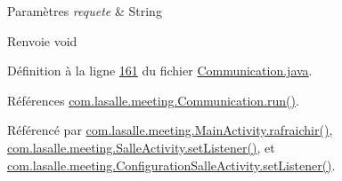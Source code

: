 \begin{DoxyParams}{Paramètres}
{\em requete} & String \\
\hline
\end{DoxyParams}
\begin{DoxyReturn}{Renvoie}
void 
\end{DoxyReturn}


Définition à la ligne \hyperlink{_communication_8java_source_l00161}{161} du fichier \hyperlink{_communication_8java_source}{Communication.\+java}.



Références \hyperlink{_communication_8java_source_l00247}{com.\+lasalle.\+meeting.\+Communication.\+run()}.



Référencé par \hyperlink{_main_activity_8java_source_l00330}{com.\+lasalle.\+meeting.\+Main\+Activity.\+rafraichir()}, \hyperlink{_salle_activity_8java_source_l00132}{com.\+lasalle.\+meeting.\+Salle\+Activity.\+set\+Listener()}, et \hyperlink{_configuration_salle_activity_8java_source_l00138}{com.\+lasalle.\+meeting.\+Configuration\+Salle\+Activity.\+set\+Listener()}.


